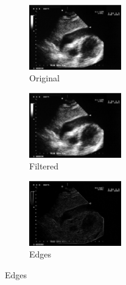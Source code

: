 \documentclass[a4paper,10pt,twocolumn]{article}
\begin{document}
\begin{center}
	\begin{figure}[!htb]
		\begin{subfigure}[a!]{4cm}
			\includegraphics[width=4cm]{image/im1/im_1}
			\caption{Original}
		\end{subfigure}
		\begin{subfigure}[b!]{4cm}
			\includegraphics[width=4cm]{image/im1/im_1_noise}
			\caption{Filtered}
		\end{subfigure}
		\begin{subfigure}[c!]{4cm}
			\includegraphics[width=4cm]{image/im1/im_1_edge}
			\caption{Edges}
		\end{subfigure}
		

\end{figure}
\end{center}
\end{document}
